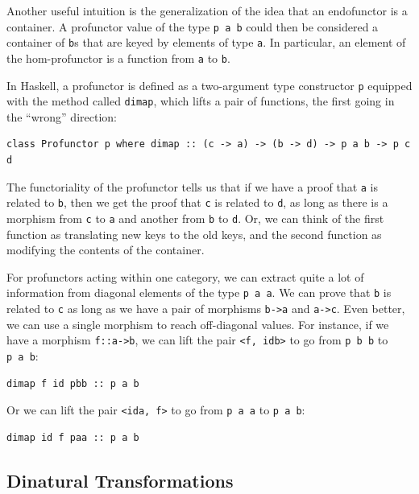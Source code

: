 Another useful intuition is the generalization of the idea that an
endofunctor is a container. A profunctor value of the type
\texttt{p\ a\ b} could then be considered a container of \texttt{b}s
that are keyed by elements of type \texttt{a}. In particular, an element
of the hom-profunctor is a function from \texttt{a} to \texttt{b}.

In Haskell, a profunctor is defined as a two-argument type constructor
\texttt{p} equipped with the method called \texttt{dimap}, which lifts a
pair of functions, the first going in the ``wrong'' direction:

\begin{verbatim}
class Profunctor p where dimap :: (c -> a) -> (b -> d) -> p a b -> p c d
\end{verbatim}

The functoriality of the profunctor tells us that if we have a proof
that \texttt{a} is related to \texttt{b}, then we get the proof that
\texttt{c} is related to \texttt{d}, as long as there is a morphism from
\texttt{c} to \texttt{a} and another from \texttt{b} to \texttt{d}. Or,
we can think of the first function as translating new keys to the old
keys, and the second function as modifying the contents of the
container.

For profunctors acting within one category, we can extract quite a lot
of information from diagonal elements of the type \texttt{p\ a\ a}. We
can prove that \texttt{b} is related to \texttt{c} as long as we have a
pair of morphisms \texttt{b-\textgreater{}a} and
\texttt{a-\textgreater{}c}. Even better, we can use a single morphism to
reach off-diagonal values. For instance, if we have a morphism
\texttt{f::a-\textgreater{}b}, we can lift the pair
\texttt{\textless{}f,\ idb\textgreater{}} to go from \texttt{p\ b\ b} to
\texttt{p\ a\ b}:

\begin{verbatim}
dimap f id pbb :: p a b
\end{verbatim}

Or we can lift the pair \texttt{\textless{}ida,\ f\textgreater{}} to go
from \texttt{p\ a\ a} to \texttt{p\ a\ b}:

\begin{verbatim}
dimap id f paa :: p a b
\end{verbatim}

\subsection{Dinatural Transformations}\label{dinatural-transformations}

